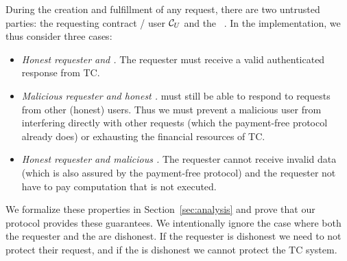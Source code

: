 During the creation and fulfillment of any request, there are two untrusted parties: the requesting contract / user ${\cal C}_U$ and the \tc~\medname. In the \tc implementation, we thus consider three cases:

\begin{itemize}
  \setlength{\itemsep}{2pt}
  \setlength{\parskip}{0pt}
  \setlength{\parsep}{0pt}
  \item {\it Honest requester and \medname.}
    The requester must receive a valid authenticated response from TC.

  \item {\it Malicious requester and honest \medname.}
    \tc must still be able to respond to requests from other (honest) users.
    Thus we must prevent a malicious user from interfering directly with other requests (which the payment-free protocol already does)
    or exhausting the financial resources of TC.

  \item {\it Honest requester and malicious \medname.}
    The requester cannot receive invalid data (which is also assured by the payment-free protocol)
    and the requester not have to pay computation that is not executed.
\end{itemize}
We formalize these properties in Section~\ref{sec:analysis} and prove that our protocol provides these guarantees.
We intentionally ignore the case where both the requester and the \medname are dishonest.
If the requester is dishonest we need to not protect their request, and if the \medname is dishonest we cannot protect the TC system.




